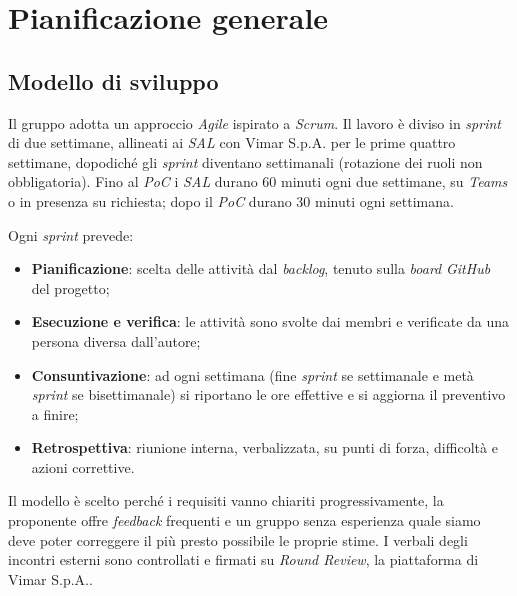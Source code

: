 \documentclass[11pt, a4paper]{article}
\begin{document}
	\newpage
	
	\section{Pianificazione generale}
	
	\subsection{Modello di sviluppo}
	Il gruppo adotta un approccio \textit{Agile} ispirato a \textit{Scrum}. Il lavoro è diviso in \textit{sprint} di due settimane, allineati ai \textit{SAL} con Vimar S.p.A. per le prime quattro settimane, dopodiché gli \textit{sprint} diventano settimanali (rotazione dei ruoli non obbligatoria). Fino al \textit{PoC} i \textit{SAL} durano 60 minuti ogni due settimane, su \textit{Teams} o in presenza su richiesta; dopo il \textit{PoC} durano 30 minuti ogni settimana.
	
	Ogni \textit{sprint} prevede:
	\begin{itemize}
		\item \textbf{Pianificazione}: scelta delle attività dal \textit{backlog}, tenuto sulla \textit{board} \textit{GitHub} del progetto;
		\item \textbf{Esecuzione e verifica}: le attività sono svolte dai membri e verificate da una persona diversa dall'autore;
		\item \textbf{Consuntivazione}: ad ogni settimana (fine \textit{sprint} se settimanale e metà \textit{sprint} se bisettimanale) si riportano le ore effettive e si aggiorna il preventivo a finire;
		\item \textbf{Retrospettiva}: riunione interna, verbalizzata, su punti di forza, difficoltà e azioni correttive.
	\end{itemize}
	Il modello è scelto perché i requisiti vanno chiariti progressivamente, la proponente offre \textit{feedback} frequenti e un gruppo senza esperienza quale siamo deve poter correggere il più presto possibile le proprie stime. I verbali degli incontri esterni sono controllati e firmati su \textit{Round Review}, la piattaforma di Vimar S.p.A..
	
\end{document}
